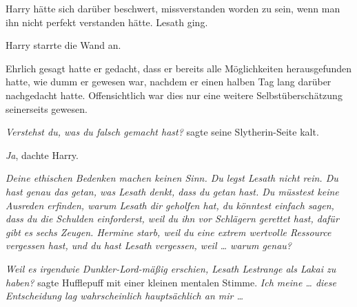 
Harry hätte sich darüber beschwert, missverstanden worden zu sein, wenn man ihn nicht perfekt verstanden hätte. Lesath ging.

Harry starrte die Wand an.


Ehrlich gesagt hatte er gedacht, dass er bereits alle Möglichkeiten herausgefunden hatte, wie dumm er gewesen war, nachdem er einen halben Tag lang darüber nachgedacht hatte. Offensichtlich war dies nur eine weitere Selbstüberschätzung seinerseits gewesen.

\emph{Verstehst du, was du falsch gemacht hast?} sagte seine Slytherin-Seite kalt.

\emph{Ja}, dachte Harry.

\emph{Deine ethischen Bedenken machen keinen Sinn. Du legst Lesath nicht rein. Du hast genau das getan, was Lesath denkt, dass du getan hast. Du müsstest keine Ausreden erfinden, warum Lesath dir geholfen hat, du könntest einfach sagen, dass du die Schulden einforderst, weil du ihn vor Schlägern gerettet hast, dafür gibt es sechs Zeugen. Hermine starb, weil du eine extrem wertvolle Ressource vergessen hast, und du hast Lesath vergessen, weil … warum genau?}

\emph{Weil es irgendwie Dunkler-Lord-mäßig erschien, Lesath Lestrange als Lakai zu haben?} sagte Hufflepuff mit einer kleinen mentalen Stimme. \emph{Ich meine … diese Entscheidung lag wahrscheinlich hauptsächlich an mir …}

